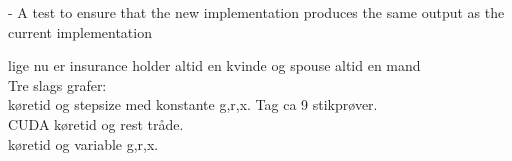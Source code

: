 - A test to ensure that the new implementation produces the same output as the current implementation


lige nu er insurance holder altid en kvinde og spouse altid en mand \\

Tre slags grafer: \\
køretid og stepsize med konstante g,r,x. Tag ca 9 stikprøver. \\
CUDA køretid og rest tråde. \\
køretid og variable g,r,x.
